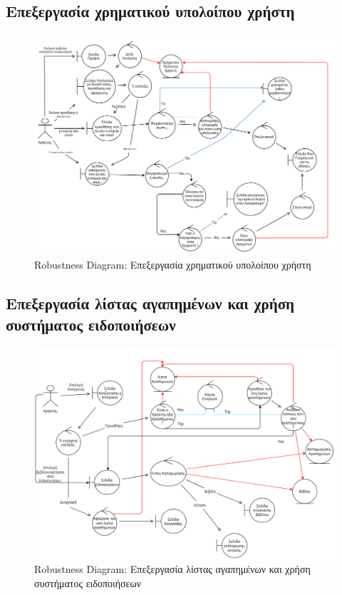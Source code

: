 \documentclass[12pt,a4paper]{article}
\begin{document}
\subsection{Επεξεργασία χρηματικού υπολοίπου χρήστη}
\begin{figure}[H]
	\includegraphics[width=\textwidth]{Edit User Balance Robustness.png}
	\caption{Robustness Diagram: Επεξεργασία χρηματικού υπολοίπου χρήστη}
	\label{Robustness Diagram: Επεξεργασία χρηματικού υπολοίπου χρήστη}
\end{figure}

\subsection{Επεξεργασία λίστας αγαπημένων και χρήση συστήματος ειδοποιήσεων}
\begin{figure}[H]
	\includegraphics[width=\textwidth]{Favorite Users and Notification System Robustness.png}
	\caption{Robustness Diagram: Επεξεργασία λίστας αγαπημένων και χρήση συστήματος ειδοποιήσεων}
	\label{Robustness Diagram: Επεξεργασία λίστας αγαπημένων και χρήση συστήματος ειδοποιήσεων}
\end{figure}
\end{document}
